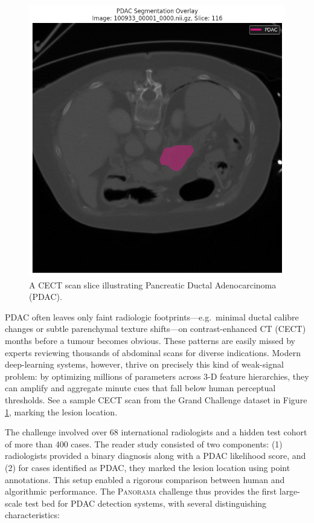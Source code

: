 \documentclass[conference]{IEEEtran}
\begin{document}
\begin{figure}[htbp]
  \centering
  \includegraphics[width=0.75\linewidth]{./figures/pdac_sample.png}
  \caption{A CECT scan slice illustrating Pancreatic Ductal Adenocarcinoma (PDAC).}
  \label{fig:ct_scan}
\end{figure}

PDAC often leaves only faint radiologic footprints—e.g.\ minimal ductal calibre changes or subtle parenchymal texture shifts—on contrast-enhanced CT (CECT) months before a tumour becomes obvious.  These patterns are easily missed by experts reviewing thousands of abdominal scans for diverse indications.  Modern deep-learning systems, however, thrive on precisely this kind of weak-signal problem: by optimizing millions of parameters across 3-D feature hierarchies, they can amplify and aggregate minute cues that fall below human perceptual thresholds\cite{b7, b8}. See a sample CECT scan from the Grand Challenge dataset in Figure \ref{fig:ct_scan}, marking the lesion location.

The challenge involved over 68 international radiologists and a hidden test cohort of more than 400 cases. The reader study consisted of two components: (1) radiologists provided a binary diagnosis along with a PDAC likelihood score, and (2) for cases identified as PDAC, they marked the lesion location using point annotations. This setup enabled a rigorous comparison between human and algorithmic performance. The \textsc{Panorama} challenge thus provides the first large-scale test bed for PDAC detection systems, with several distinguishing characteristics:
\end{document}
